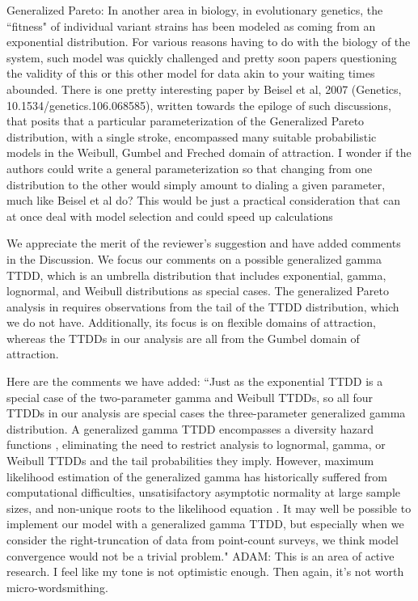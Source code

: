 \documentclass[12pt]{article}
\renewenvironment{quote}  %
              {\list{}{\rightmargin\leftmargin}\normalfont%
               \item\relax}
              {\endlist}
\newcommand{\adam}[1]{{\color{blue} ADAM: #1}}
\begin{document}
Generalized Pareto: In another area in biology, in evolutionary genetics, the ``fitness" of individual variant strains has been modeled as coming from an exponential distribution.  For various reasons having to do with the biology of the system, such model was quickly challenged and pretty soon papers questioning the validity of this or this other model for data akin to your waiting times abounded. There is one pretty interesting paper by Beisel et al, 2007 (Genetics, 10.1534/genetics.106.068585), written towards the epiloge of such discussions, that posits that a particular parameterization of the Generalized Pareto distribution, with a single stroke, encompassed many suitable probabilistic models in the Weibull, Gumbel and Freched domain of attraction.  I wonder if the authors could write a general parameterization so that changing from one distribution to the other would simply amount to dialing a given parameter, much like Beisel et al do?  This would be just a practical
consideration that can at once deal with model selection and could speed up calculations
\begin{quote}
We appreciate the merit of the reviewer's suggestion and have added comments in the Discussion.
We focus our comments on a possible generalized gamma TTDD, which is an umbrella distribution that includes exponential, gamma, lognormal, and Weibull distributions as special cases.
The generalized Pareto analysis in \citet{Beisel2007} requires observations from the tail of the TTDD distribution, which we do not have.
Additionally, its focus is on flexible domains of attraction, whereas the TTDDs in our analysis are all from the Gumbel domain of attraction.

Here are the comments we have added:
``Just as the exponential TTDD is a special case of the two-parameter gamma and Weibull TTDDs, so all four TTDDs in our analysis are special cases the three-parameter generalized gamma distribution.
A generalized gamma TTDD encompasses a diversity hazard functions \citep{Cox2007}, eliminating the need to restrict analysis to lognormal, gamma, or Weibull TTDDs and the tail probabilities they imply.
However, maximum likelihood estimation of the generalized gamma has historically suffered from computational difficulties, unsatisifactory asymptotic normality at large sample sizes, and non-unique roots to the likelihood equation \citep{CoorayAnand2008, NoufailyJones2013}.
It may well be possible to implement our model with a generalized gamma TTDD, but especially when we consider the right-truncation of data from point-count surveys, we think model convergence would not be a trivial problem."
\adam{This is an area of active research.  I feel like my tone is not optimistic enough.  Then again, it's not worth micro-wordsmithing.}
\end{quote}
\end{document}
